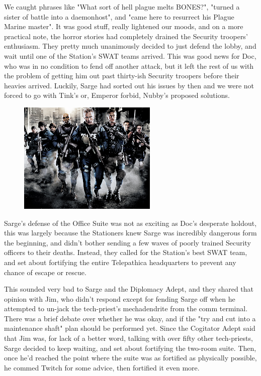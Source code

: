 We caught phrases like "What sort of hell plague melts BONES?", "turned a sister of battle into a daemonhost", and "came here to resurrect his Plague Marine master". 
It was good stuff, really lightened our moods, and on a more practical note, the horror stories had completely drained the Security troopers' enthusiasm. 
They pretty much unanimously decided to just defend the lobby, and wait until one of the Station's SWAT teams arrived. 
This was good news for Doc, who was in no condition to fend off another attack, but it left the rest of us with the problem of getting him out past thirty-ish Security troopers before their heavies arrived. 
Luckily, Sarge had sorted out his issues by then and we were not forced to go with Tink's or, Emperor forbid, Nubby's proposed solutions.

\begin{figure}
	\begin{center}
		\includegraphics[width=\figwidth]{pics/14/38.png}
	\end{center}
\end{figure}
Sarge's defense of the Office Suite was not as exciting as Doc's desperate holdout, this was largely because the Stationers knew Sarge was incredibly dangerous form the beginning, and didn't bother sending a few waves of poorly trained Security officers to their deaths. 
Instead, they called for the Station's best SWAT team, and set about fortifying the entire Telepathica headquarters to prevent any chance of escape or rescue.

This sounded very bad to Sarge and the Diplomacy Adept, and they shared that opinion with Jim, who didn't respond except for fending Sarge off when he attempted to un-jack the tech-priest's mechadendrite from the comm terminal. 
There was a brief debate over whether he was okay, and if the "try and cut into a maintenance shaft" plan should be performed yet. 
Since the Cogitator Adept said that Jim was, for lack of a better word, talking with over fifty other tech-priests, Sarge decided to keep waiting, and set about fortifying the two-room suite. 
Then, once he'd reached the point where the suite was as fortified as physically possible, he commed Twitch for some advice, then fortified it even more.

